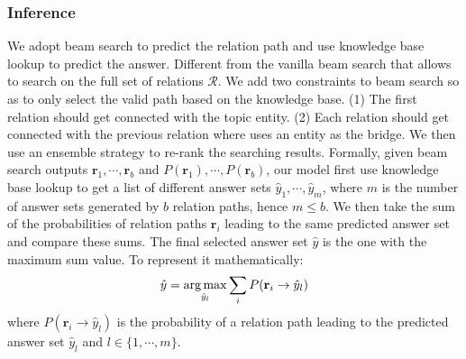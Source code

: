 \subsubsection{Inference} We adopt beam search to predict the relation path and use knowledge base lookup to predict the answer. Different from the vanilla beam search that allows to search on the full set of relations $\mathcal{R}$. We add two constraints to beam search so as to only select the valid path based on the knowledge base. (1) The first relation should get connected with the topic entity. (2) Each relation should get connected with the previous relation where uses an entity as the bridge. We then use an ensemble strategy to re-rank the searching results. Formally, given beam search outputs $\mathbf{r}_{1},\cdots,\mathbf{r}_{b}$ and $P(\mathbf{r}_{1}),\cdots,P(\mathbf{r}_{b})$, our model first use knowledge base lookup to get a list of different answer sets $\hat{y}_1,\cdots,\hat{y}_m$, where $m$ is the number of answer sets generated by $b$ relation paths, hence $m \leq b$. We then take the sum of the probabilities of relation paths $\mathbf{r}_i$ leading to the same predicted answer set and compare these sums. The final selected answer set $\hat{y}$ is the one with the maximum sum value. To represent it mathematically:
\begin{equation}
\hat{y}=\operatorname*{arg\,max}_{\hat{y}_l} \sum_{i} P(\mathbf{r}_i\rightarrow \hat{y}_l)
\end{equation}
where $P(\mathbf{r}_i\rightarrow \hat{y}_l)$ is the probability of a relation path leading to the predicted answer set $\hat{y}_l$ and $l \in \lbrace 1, \cdots, m\rbrace$.